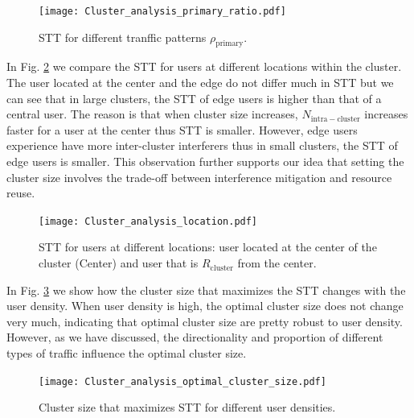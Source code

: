 \documentclass[10pt, conference, letterpaper]{IEEEtran}
\begin{document}
\begin{figure}
	\centering
	\texttt{[image: Cluster\_analysis\_primary\_ratio.pdf]}
	\caption{STT for different tranffic patterns $\rho_{\mathrm{primary}}$.}
	\label{fig:clusteranalysis:primary_ratio}
\end{figure}

In Fig. \ref{fig:clusteranalysis:location} we compare the STT for users at different locations within the cluster.
The user located at the center and the edge do not differ much in STT but we can see that in large clusters, the STT of edge users is higher than that of a central user. 
The reason is that when cluster size increases, $N_{\mathrm{intra-cluster}}$ increases faster for a user at the center thus STT is smaller. 
However, edge users experience have more inter-cluster interferers thus in small clusters, the STT of edge users is smaller. This observation further supports our idea that setting the cluster size involves the trade-off between interference mitigation and resource reuse.

\begin{figure}
	\centering
	\texttt{[image: Cluster\_analysis\_location.pdf]}
	\caption{STT for users at different locations: user located at the center of the cluster (Center) and user that is $R_{\mathrm{cluster}}$ from the center.}
	\label{fig:clusteranalysis:location}
\end{figure}


In Fig. \ref{fig:clustereanalysis:optimal_cluster_size} we show how the cluster size that maximizes the STT changes with the user density. 
When user density is high, the optimal cluster size does not change very much, indicating that optimal cluster size are pretty robust to user density. 
However, as we have discussed, the directionality and proportion of different types of traffic influence the optimal cluster size. 

\begin{figure}
	\centering
	\texttt{[image: Cluster\_analysis\_optimal\_cluster\_size.pdf]}
	\caption{Cluster size that maximizes STT for different user densities.}
	\label{fig:clustereanalysis:optimal_cluster_size}
\end{figure}
\end{document}
